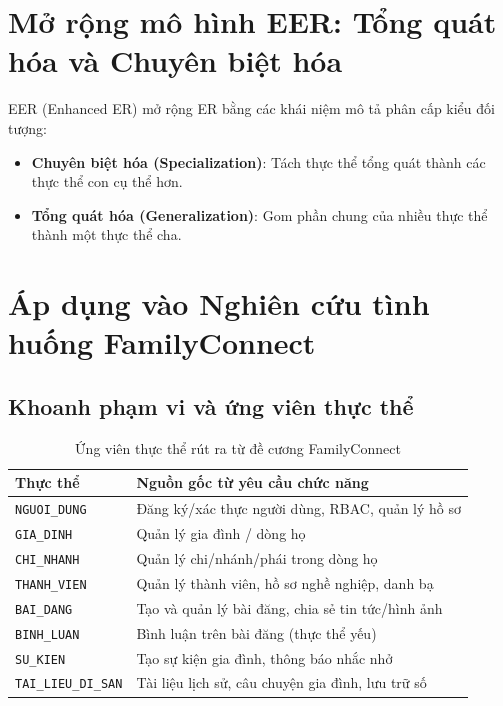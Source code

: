 \section{Mở rộng mô hình EER: Tổng quát hóa và Chuyên biệt hóa}
\label{sec:eer}
EER (Enhanced ER) mở rộng ER bằng các khái niệm mô tả phân cấp kiểu đối tượng:
\begin{itemize}
    \item \textbf{Chuyên biệt hóa (Specialization)}: Tách thực thể tổng quát thành các thực thể con cụ thể hơn.
    \item \textbf{Tổng quát hóa (Generalization)}: Gom phần chung của nhiều thực thể thành một thực thể cha.
\end{itemize}

\section{Áp dụng vào Nghiên cứu tình huống FamilyConnect}
\label{sec:casestudy_er}

\subsection{Khoanh phạm vi và ứng viên thực thể}
\begin{table}[H]
\centering
\begin{tabular}{|l|p{9.5cm}|}
\hline
\textbf{Thực thể} & \textbf{Nguồn gốc từ yêu cầu chức năng} \\
\hline
\texttt{NGUOI\_DUNG} & Đăng ký/xác thực người dùng, RBAC, quản lý hồ sơ \\
\texttt{GIA\_DINH} & Quản lý gia đình / dòng họ \\
\texttt{CHI\_NHANH} & Quản lý chi/nhánh/phái trong dòng họ \\
\texttt{THANH\_VIEN} & Quản lý thành viên, hồ sơ nghề nghiệp, danh bạ \\
\texttt{BAI\_DANG} & Tạo và quản lý bài đăng, chia sẻ tin tức/hình ảnh \\
\texttt{BINH\_LUAN} & Bình luận trên bài đăng (thực thể yếu) \\
\texttt{SU\_KIEN} & Tạo sự kiện gia đình, thông báo nhắc nhở \\
\texttt{TAI\_LIEU\_DI\_SAN} & Tài liệu lịch sử, câu chuyện gia đình, lưu trữ số \\
\hline
\end{tabular}
\caption{Ứng viên thực thể rút ra từ đề cương FamilyConnect}
\label{tab:ungvien_thucthe}
\end{table}

